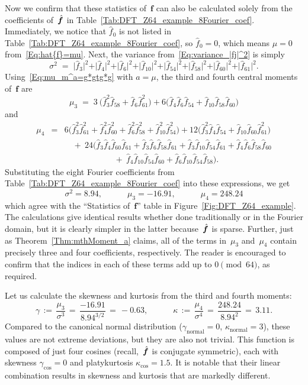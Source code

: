 \documentclass[letterpaper,11pt]{article}
\newcommand{\bs}[1]{{\boldsymbol{#1}}}
\newcommand{\Gr}[1]{\big( #1 \big)}
\newcommand{\GR}[1]{\Big( #1 \Big)}
\newcommand{\abs}[1]{\vert #1 \vert}
\newcommand{\hatbsf}{{\kern+0.25em}\hat{{\kern-0.25em}\bs{f}}}
\theoremstyle{definition} \newtheorem{remark}{Remark}
\begin{document}
Now we confirm that these statistics of~$\bs{f}$ can also be calculated solely from the coefficients of~$\hatbsf$ in Table~\ref{Tab:DFT_Z64_example_8Fourier_coef}. Immediately, we notice that $\hat{f}_0$ is not listed in Table~\ref{Tab:DFT_Z64_example_8Fourier_coef}, so $\hat{f}_0 = 0$, which means $\mu = 0$ from~\eqref{Eq:hat{f}=mu}. Next, the variance from~\eqref{Eq:variance_|fj|^2} is simply
$$
\sigma^2 \;=\; \abs{\hat{f}_3}^2 + \abs{\hat{f}_4}^2 + \abs{\hat{f}_6}^2 + \abs{\hat{f}_{10}}^2 + \abs{\hat{f}_{54}}^2 + \abs{\hat{f}_{58}}^2 + \abs{\hat{f}_{60}}^2 + \abs{\hat{f}_{61}}^2.
$$
Using~\eqref{Eq:mu_m^a=g*gtg*g} with $a=\mu$, the third and fourth central moments of~$\bs{f}$ are
$$
\mu_3 \;=\; 3 \:\!\Gr{\hat{f}_3^2 \hat{f}_{58} + \hat{f}_6 \hat{f}_{61}^2} + 6 \Gr{\hat{f}_4 \hat{f}_6 \hat{f}_{54} + \hat{f}_{10} \hat{f}_{58} \hat{f}_{60}}
$$
and
\begin{eqnarray*}
\mu_4 &=&
6 \Gr{\hat{f}_3^2 \hat{f}_{61}^2 + \hat{f}_4^2 \hat{f}_{60}^2 + \hat{f}_6^2 \hat{f}_{58}^2 + \hat{f}_{10}^2 \hat{f}_{54}^2} +
12 \Gr{\hat{f}_3^2 \hat{f}_4 \hat{f}_{54} + \hat{f}_{10} \hat{f}_{60} \hat{f}_{61}^2} \\[5pt]
&& \quad +\: 24 \GR{\hat{f}_3 \hat{f}_4 \hat{f}_{60} \hat{f}_{61} + \hat{f}_3 \hat{f}_6 \hat{f}_{58} \hat{f}_{61} +  \hat{f}_3 \hat{f}_{10} \hat{f}_{54} \hat{f}_{61} + \hat{f}_4 \hat{f}_6 \hat{f}_{58} \hat{f}_{60} \\[3pt]
&& \qquad\qquad\qquad +\: \hat{f}_4 \hat{f}_{10} \hat{f}_{54} \hat{f}_{60} + \hat{f}_6 \hat{f}_{10} \hat{f}_{54} \hat{f}_{58}}.
\end{eqnarray*}
Substituting the eight Fourier coefficients from Table~\ref{Tab:DFT_Z64_example_8Fourier_coef} into these expressions, we get
$$
\sigma^2 = 8.94, \qquad\quad \mu_3 = -16.91, \qquad\quad \mu_4 = 248.24
$$
which agree with the ``Statistics of~$\bs{f}$'' table in Figure~\ref{Fig:DFT_Z64_example}. The calculations give identical results whether done traditionally or in the Fourier domain, but it is clearly simpler in the latter because~$\hatbsf$ is sparse. Further, just as Theorem~\ref{Thm:mthMoment_a} claims, all of the terms in~$\mu_3$ and~$\mu_4$ contain precisely three and four coefficients, respectively. The reader is encouraged to confirm that the indices in each of these terms add up to ${0\!\pmod{64}}$, as required.

Let us calculate the skewness and kurtosis from the third and fourth moments:
$$
\gamma \,:=\, \frac{\mu_3}{\sigma^3} \,=\, \frac{-16.91}{8.94^{3/2}} \,=\, -0.63, \quad\qquad
\kappa \,:=\, \frac{\mu_4}{\sigma^4} \,=\, \frac{248.24}{8.94^2} \,=\, 3.11.
$$
Compared to the canonical normal distribution ($\gamma_\text{normal} = 0$, $\kappa_{\text{normal}} = 3$), these values are not extreme deviations, but they are also not trivial. This function is composed of just four cosines (recall,~$\hatbsf$ is conjugate symmetric), each with skewness $\gamma_{\text{cos}}=0$ and platykurtosis $\kappa_{\text{cos}}=1.5$. It is notable that their linear combination results in skewness and kurtosis that are markedly different.
\end{document}
